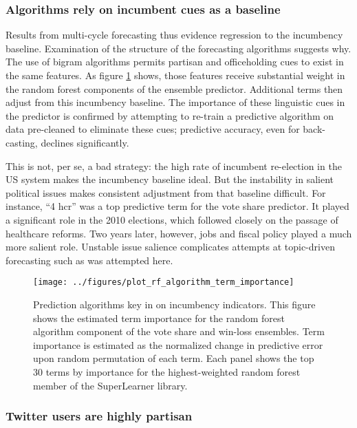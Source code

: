 \documentclass{article}
\begin{document}
\subsubsection{Algorithms rely on incumbent cues as a baseline}
\label{sec:algor-behav-perf}

Results from multi-cycle forecasting thus evidence regression to
the incumbency baseline. Examination of the structure of the
forecasting algorithms suggests why. The use of
bigram algorithms permits partisan and officeholding cues to exist in
the same features. As figure \ref{fig:rf-term-importance} shows, those
features receive substantial weight in the random forest components of
the ensemble predictor. Additional terms then adjust from this incumbency baseline. The
importance of these linguistic cues in the predictor is confirmed by
attempting to re-train a predictive algorithm on data pre-cleaned to
eliminate these cues; predictive accuracy, even for back-casting,
declines significantly.

This is not, per se, a bad strategy: the high rate of incumbent
re-election in the US system makes the incumbency baseline ideal. But
the instability in salient political issues makes consistent
adjustment from that baseline difficult. For instance, ``4 hcr'' was a
top predictive term for the vote share predictor. It played a
significant role in the 2010 elections, which followed closely on the
passage of healthcare reforms. Two years later, however, jobs and
fiscal policy played a much more salient role. Unstable issue salience
complicates attempts at topic-driven forecasting such as was attempted
here. 

\begin{figure}[ht]
  \centering
  \texttt{[image: ../figures/plot\_rf\_algorithm\_term\_importance]}
  \caption{Prediction algorithms key in on incumbency
    indicators. This figure shows the estimated term importance for the random forest algorithm component
    of the vote share and win-loss ensembles. Term importance is
    estimated as the normalized change in predictive error upon
    random permutation of each term. Each panel shows the top
    30 terms by importance for the highest-weighted random forest
    member of the SuperLearner library.}
  \label{fig:rf-term-importance}
\end{figure}

\subsubsection{Twitter users are highly partisan}
\label{sec:part-cont-twitt}
\end{document}
